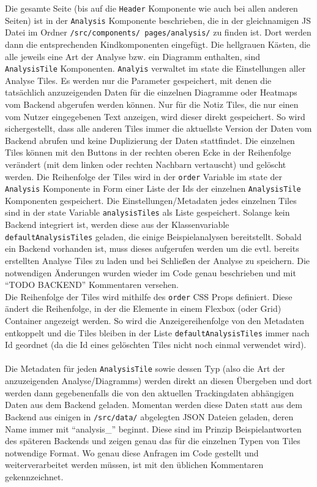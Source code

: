 Die gesamte Seite (bis auf die \texttt{Header} Komponente wie auch bei allen anderen Seiten) ist in der \texttt{Analysis} Komponente beschrieben, die in der gleichnamigen JS Datei im Ordner \texttt{/src/components/ pages/analysis/} zu finden ist. Dort werden dann die entsprechenden Kindkomponenten eingefügt. Die hellgrauen Kästen, die alle jeweils eine Art der Analyse bzw. ein Diagramm enthalten, sind \texttt{AnalysisTile} Komponenten. \texttt{Analyis} verwaltet im state die Einstellungen aller Analyse Tiles. Es werden nur die Parameter gespeichert, mit denen die tatsächlich anzuzeigenden Daten für die einzelnen Diagramme oder Heatmaps vom Backend abgerufen werden können. Nur für die Notiz Tiles, die nur einen vom Nutzer eingegebenen Text anzeigen, wird dieser direkt gespeichert. So wird sichergestellt, dass alle anderen Tiles immer die aktuellste Version der Daten vom Backend abrufen und keine Duplizierung der Daten stattfindet. Die einzelnen Tiles können mit den Buttons in der rechten oberen Ecke in der Reihenfolge verändert (mit dem linken oder rechten Nachbarn vertauscht) und gelöscht werden. Die Reihenfolge der Tiles wird in der \texttt{order} Variable im state der \texttt{Analysis} Komponente in Form einer Liste der Ids der einzelnen \texttt{AnalysisTile} Komponenten gespeichert. Die Einstellungen/Metadaten jedes einzelnen Tiles sind in der state Variable \texttt{analysisTiles} als Liste gespeichert. Solange kein Backend integriert ist, werden diese aus der Klassenvariable \texttt{defaultAnalysisTiles} geladen, die einige Beispielanalysen bereitstellt. Sobald ein Backend vorhanden ist, muss dieses aufgerufen werden um die evtl. bereits erstellten Analyse Tiles zu laden und bei Schließen der Analyse zu speichern. Die notwendigen Änderungen wurden wieder im Code genau beschrieben und mit ``TODO BACKEND'' Kommentaren versehen.\\
Die Reihenfolge der Tiles wird mithilfe des \texttt{order} CSS Props definiert. Diese ändert die Reihenfolge, in der die Elemente in einem Flexbox (oder Grid) Container angezeigt werden. So wird die Anzeigereihenfolge von den Metadaten entkoppelt und die Tiles bleiben in der Liste \texttt{defaultAnalysisTiles} immer nach Id geordnet (da die Id eines gelöschten Tiles nicht noch einmal verwendet wird).\\
\\
Die Metadaten für jeden \texttt{AnalysisTile} sowie dessen Typ (also die Art der anzuzeigenden Analyse/Diagramms) werden direkt an diesen Übergeben und dort werden dann gegebenenfalls die von den aktuellen Trackingdaten abhängigen Daten aus dem Backend geladen. Momentan werden diese Daten statt aus dem Backend aus einigen in \texttt{/src/data/} abgelegten JSON Dateien geladen, deren Name immer mit ``analysis\_'' beginnt. Diese sind im Prinzip Beispielantworten des späteren Backends und zeigen genau das für die einzelnen Typen von Tiles notwendige Format. Wo genau diese Anfragen im Code gestellt und weiterverarbeitet werden müssen, ist mit den üblichen Kommentaren gekennzeichnet.\\

